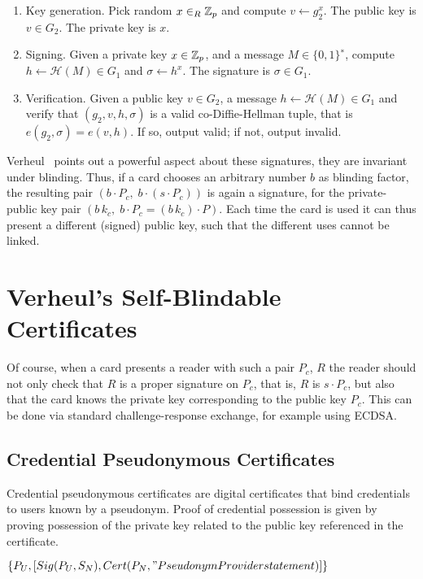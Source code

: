 \begin{enumerate}
  \item Key generation. Pick random $x \in_R \mathbb{Z}_p$ and compute
    $v \gets g_2^x$. The public key is $v \in G_2$. The private key is $x$.
  \item Signing. Given a private key $x \in \mathbb{Z}_p$, and a message
    $M \in \{0, 1\}^∗$, compute $h \gets \mathcal{H}(M) \in G_1$ and
    $\sigma \gets h^x$. The signature is $\sigma \in G_1$.
  \item Verification. Given a public key $v \in G_2$, a message
    $h \gets \mathcal{H}(M) \in G_1$ and verify that $(g_2, v, h, \sigma)$ is
    a valid co-Diffie-Hellman tuple, that is $e(g_2, \sigma) = e(v, h)$. If
    so, output valid; if not, output invalid.
\end{enumerate}

Verheul~\cite{Verheul01} points out a powerful aspect about these signatures,
they are invariant under blinding. Thus, if a card chooses an arbitrary number
$b$ as blinding factor, the resulting pair
$(b\cdot P_{c}, \; b\cdot (s\cdot P_{c}))$ is again a signature, for the
private-public key pair $(b\,k_{c}, \; b\cdot P_{c} = (b\,k_{c})\cdot P)$. Each
time the card is used it can thus present a different (signed) public key, such
that the different uses cannot be linked.

\section{Verheul's Self-Blindable Certificates}

Of course, when a card presents a reader with such a pair $P_c$, $R$
the reader should not only check that $R$ is a proper signature on
$P_c$, that is, $R$ is $s\cdot P_c$, but also that the card knows the private
key corresponding to the public key $P_c$. This can be done via standard
challenge-response exchange, for example using ECDSA.

\subsection{Credential Pseudonymous Certificates}

Credential pseudonymous certificates are digital certificates that bind
credentials to users known by a pseudonym. Proof of credential possession is
given by proving possession of the private key related to the public key
referenced in the certificate.

$\{P_U, [Sig(P_U, S_N), Cert(P_N, "Pseudonym Provider statement)]\}$

